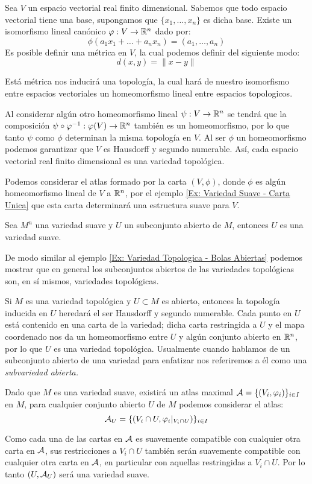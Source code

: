 \begin{example}\label{Ex: Variedad Sauve - Espacios Vectoriales}
	Sea $V$ un espacio vectorial real finito dimensional. Sabemos que todo espacio vectorial tiene una base, supongamos que $\{x_1,\dots,x_n\}$ es dicha base. Existe un isomorfismo lineal canónico $\varphi: V \to \mathbb{R}^n$ dado por:
	\[ \phi(a_1 x_1 + \dots + a_n x_n) = (a_1, \dots, a_n) \]
	Es posible definir una métrica en $V$, la cual podemos definir del siguiente modo:
	\[d(x,y) = \|x - y\|\]

	Está métrica nos inducirá una topología, la cual hará de nuestro isomorfismo entre espacios vectoriales un homeomorfismo lineal entre espacios topologicos.

	Al considerar algún otro homeomorfismo lineal $\psi: V \to \mathbb{R}^n$ se tendrá que la composición $\psi \circ \varphi^{-1}: \varphi(V) \to \mathbb{R}^n$ también es un homeomorfismo, por lo que tanto $\psi$ como $\phi$ determinan la misma topología en $V$. Al ser $\phi$ un homeomorfismo podemos garantizar que $V$ es Hausdorff y segundo numerable. Así, cada espacio vectorial real finito dimensional es una variedad topológica.

	Podemos considerar el atlas formado por la carta $(V,\phi)$, donde $\phi$ es algún homeomorfismo lineal de $V$ a $\mathbb{R}^n$, por el ejemplo \ref{Ex: Variedad Suave - Carta Unica} que esta carta determinará una estructura suave para $V$.
\end{example}

\begin{example}\label{Ex: Variedad Suave - Subvariedades Suaves}
	Sea $M^n$ una variedad suave y $U$ un subconjunto abierto de $M$, entonces $U$ es una variedad suave.

	De modo similar al ejemplo \ref{Ex: Variedad Topologica - Bolas Abiertas} podemos mostrar que en general los subconjuntos abiertos de las variedades topológicas son, en sí mismos, variedades topológicas.


	Si $M$ es una variedad topológica y $U \subset M$ es abierto, entonces la topología inducida en $U$ heredará el ser Hausdorff y segundo numerable. Cada punto en $U$ está contenido en una carta de la variedad; dicha carta restringida a $U$ y el mapa coordenado nos da un homeomorfismo entre $U$ y algún conjunto abierto en $\mathbb{R}^n$, por lo que $U$ es una variedad topológica. Usualmente cuando hablamos de un subconjunto abierto de una variedad para enfatizar nos referiremos a él como una \it{subvariedad abierta}.

	Dado que $M$ es una variedad suave, existirá un atlas maximal $\mathcal{A} = \{(V_i,\varphi_i) \}_{i \in I}$ en $M$, para cualquier conjunto abierto $U$ de $M$ podemos considerar el atlas:
	\[ \mathcal{A}_U = \{(V_i \cap U, \varphi_i |_{V_i \cap U})\}_{i \in I} \]

	Como cada una de las cartas en $\mathcal{A}$ es suavemente compatible con cualquier otra carta en $\mathcal{A}$, sus restricciones a $V_i \cap U$ también serán suavemente compatible con cualquier otra carta en $\mathcal{A}$, en particular con aquellas restringidas a $V_i \cap U$. Por lo tanto $(U, \mathcal{A}_U)$ será una variedad suave.
\end{example}

